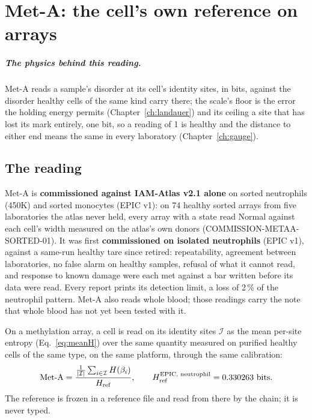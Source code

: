 \chapter{Met-A: the cell's own reference on arrays}\label{ch:meta}

\paragraph{The physics behind this reading.} Met-A reads a sample's disorder at its cell's identity sites, in bits, against the disorder healthy cells of the same kind carry there; the scale's floor is the error the holding energy permits (Chapter~\ref{ch:landauer}) and its ceiling a site that has lost its mark entirely, one bit, so a reading of 1 is healthy and the distance to either end means the same in every laboratory (Chapter~\ref{ch:gauge}).

\section{The reading}

\begin{keybox}[title=Status]
Met-A is \textbf{commissioned against IAM-Atlas v2.1 alone} on sorted neutrophils (450K) and sorted monocytes (EPIC v1): on 74 healthy sorted arrays from five laboratories the atlas never held, every array with a state read Normal against each cell's width measured on the atlas's own donors (COMMISSION-METAA-SORTED-01). It was first \textbf{commissioned on isolated neutrophils} (EPIC v1), against a same-run healthy tare since retired: repeatability, agreement between laboratories,
no false alarm on healthy samples, refusal of what it cannot read, and response to known damage were each met against a bar written
before its data were read. Every report prints its detection limit, a loss of 2\,\% of the neutrophil pattern. Met-A also reads whole blood; those readings carry the note that whole blood has not yet been tested with it. \measured{}
\end{keybox}

On a methylation array, a cell is read on its identity sites $\mathcal I$ as the mean per-site entropy (Eq.~\eqref{eq:meanH})
over the same quantity measured on purified healthy cells of the same type, on the same platform, through the same
calibration:
\begin{equation}
  \text{Met-A}=\frac{\frac{1}{|\mathcal I|}\sum_{i\in\mathcal I}H(\beta_i)}{H_{\rm ref}},
  \qquad H_{\rm ref}^{\text{EPIC, neutrophil}}=0.330263\ \text{bits}.
  \label{eq:meta}
\end{equation}
\calibrated{} The reference is frozen in a reference file and read from
there by the chain; it is never typed.


